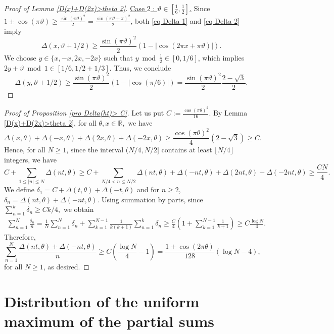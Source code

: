 \documentclass[12pt]{amsart}
\theoremstyle{definition}
\numberwithin{equation}{section}
\numberwithin{equation}{section}
\def\R{\mathbb{R}}
\begin{document}
\begin{proof}[Proof of Lemma \ref{D(x)+D(2x)>theta 2}]
\underline{Case $2$ : $\vartheta \in\left[\frac{1}{6},\frac{1}{2}\right]$.} 
Since $1\pm\cos(\pi \vartheta)\geq \frac{\sin(\pi\vartheta)^2}{2} =\frac{\sin(\pi\vartheta+\pi)^2}{2}  $, both \eqref{eq Delta 1} and \eqref{eq Delta 2} imply
\[
\Delta(x,\vartheta+1/2) \geq 
\frac{\sin(\pi\vartheta)^2}{2}
(1-|\cos(2\pi x+\pi \vartheta)|).
\]
We choose \(y\in\{x,-x,2x,-2x\}\) such that
\(y \bmod \frac12 \in [0,1/6]\), which implies $2 y+ \vartheta \bmod 1 \in[1/6,1/2+1/3]$. Thus, we conclude
\[
\Delta(y,\vartheta+1/2)\geq 
\frac{\sin(\pi\vartheta)^2}{2}
(1-|\cos(\pi/6)|)
= \frac{\sin(\pi\vartheta)^2}{2}\frac{2-\sqrt{3}}{2}.
\]


\end{proof}

\begin{proof}[Proof of Proposition \ref{pro Delta(ht)> C}] Let us put $C := \frac{\cos(\pi\theta)^2}{16}$. By Lemma \ref{D(x)+D(2x)>theta 2}, for all $\theta, x\in\R,$ we have
\begin{equation}
\Delta(x,\theta)+\Delta(-x,\theta)
+\Delta(2x,\theta)+\Delta(-2x,\theta) 
\geq
    \frac{\cos(\pi\theta)^2}{4}(2-\sqrt{3})\geq  C.
\end{equation} 
Hence, for all $N\geq 1$, since the interval \((N/4,N/2]\) contains at least \(\lfloor N/4 \rfloor\) integers, we have
\[C+\sum_{1\leq |n|\leq N}\Delta(nt,\theta)
\geq C+
\sum_{N/4< n\leq  N/2}\Delta(nt,\theta)+\Delta(-nt,\theta)+\Delta(2nt,\theta)+\Delta(-2nt,\theta)
\geq 
\frac{CN}{4}.\] We define
$\delta_1 = C+\Delta(t,\theta)+\Delta(-t,\theta)$ and for $n\geq 2$, $\delta_n = \Delta(nt,\theta)+\Delta(-nt, \theta)$. 
Using summation by parts, since
$\sum_{n=1}^k \delta_n \geq Ck/4,$
we obtain
\begin{align*}
\sum_{n=1}^N \frac{\delta_n}{n} = \frac{1}{N}\sum_{n=1}^N \delta_n
+\sum_{k=1}^{N-1}\frac{1}{k(k+1)}\sum_{n=1}^k \delta_n\geq \frac{C}{4} \left( 1
+\sum_{k=1}^{N-1}\frac{1}{k+1}\right)
\geq C \frac{\log N}{4}.
\end{align*}
Therefore,
\[
\sum_{n=1}^N\frac{\Delta(nt,\theta)+\Delta(-nt,\theta)}{n}
\geq C
\left(\frac{\log N}{4}-1\right)
=
\frac{1+\cos(2\pi\theta)}{128}(\log N-4),\]
for all $N\geq 1$, as desired.
\end{proof}


                                                
\section{Distribution of the uniform maximum of the partial sums }
\end{document}
